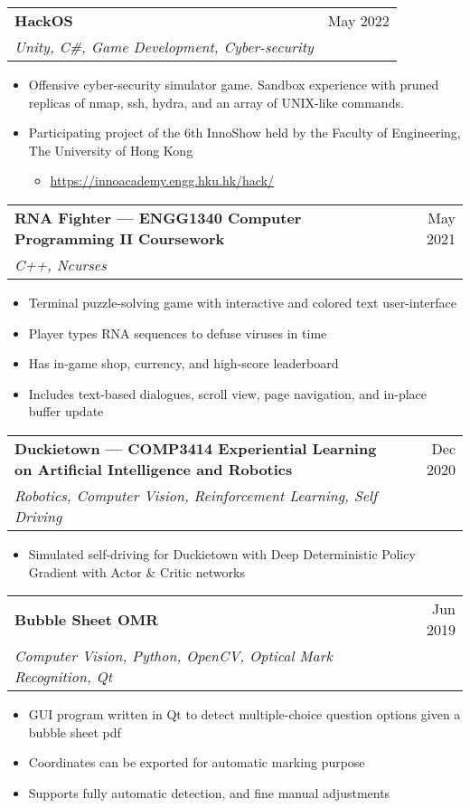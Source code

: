 \documentclass{article}
\newcommand{\jobTitle}[3]{
\begin{tabularx}{\linewidth}{ X r }
    \textbf{#1} & #2\\
    \textit{#3} &
\end{tabularx}
}
\begin{document}
\jobTitle
{HackOS}
{May 2022}
{Unity, C\#, Game Development, Cyber-security}
\begin{itemize}
    \item Offensive cyber-security simulator game. Sandbox experience with pruned replicas of nmap, ssh, hydra, and an array of UNIX-like commands.
    \item Participating project of the 6th InnoShow held by the Faculty of Engineering, The University of Hong Kong
    \begin{itemize}
        \item \href{https://innoacademy.engg.hku.hk/hack/}{https://innoacademy.engg.hku.hk/hack/}
    \end{itemize}
\end{itemize}

\jobTitle
{RNA Fighter --- ENGG1340 Computer Programming II Coursework}
{May 2021}
{C++, Ncurses}
\begin{itemize}
    \item Terminal puzzle-solving game with interactive and colored text user-interface
    \item Player types RNA sequences to defuse viruses in time
	\item Has in-game shop, currency, and high-score leaderboard
	\item Includes text-based dialogues, scroll view, page navigation, and in-place buffer update
\end{itemize}

\jobTitle
{Duckietown --- COMP3414 Experiential Learning on Artificial Intelligence and Robotics}
{Dec 2020}
{Robotics, Computer Vision, Reinforcement Learning, Self Driving}
\begin{itemize}
    \item Simulated self-driving for Duckietown with Deep Deterministic Policy Gradient with Actor \& Critic networks
\end{itemize}

\jobTitle
{Bubble Sheet OMR}
{Jun 2019}
{Computer Vision, Python, OpenCV, Optical Mark Recognition, Qt}
\begin{itemize}
    \item GUI program written in Qt to detect multiple-choice question options given a bubble sheet pdf
    \item Coordinates can be exported for automatic marking purpose
    \item Supports fully automatic detection, and fine manual adjustments
\end{itemize}
\end{document}
